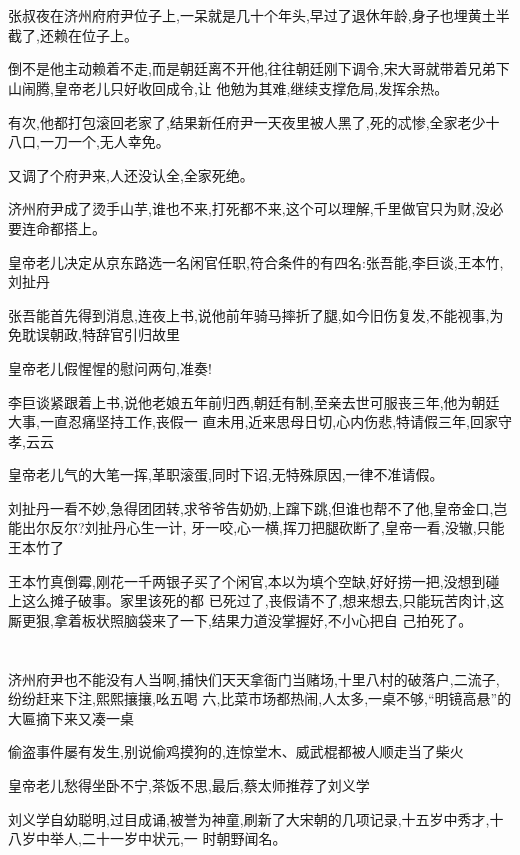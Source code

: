 ﻿\documentclass[12pt]{article}
\begin{document}
\section{}

张叔夜在济州府府尹位子上,一呆就是几十个年头,早过了退休年龄,身子也埋黄土半截了,还赖在位子上。

倒不是他主动赖着不走,而是朝廷离不开他,往往朝廷刚下调令,宋大哥就带着兄弟下山闹腾,皇帝老儿只好收回成令,让
他勉为其难,继续支撑危局,发挥余热。

有次,他都打包滚回老家了,结果新任府尹一天夜里被人黑了,死的忒惨,全家老少十八口,一刀一个,无人幸免。

又调了个府尹来,人还没认全,全家死绝。

济州府尹成了烫手山芋,谁也不来,打死都不来,这个可以理解,千里做官只为财,没必要连命都搭上。

皇帝老儿决定从京东路选一名闲官任职,符合条件的有四名:张吾能,李巨谈,王本竹,刘扯丹

张吾能首先得到消息,连夜上书,说他前年骑马摔折了腿,如今旧伤复发,不能视事,为免耽误朝政,特辞官引归故里

皇帝老儿假惺惺的慰问两句,准奏!

李巨谈紧跟着上书,说他老娘五年前归西,朝廷有制,至亲去世可服丧三年,他为朝廷大事,一直忍痛坚持工作,丧假一
直未用,近来思母日切,心内伤悲,特请假三年,回家守孝,云云

皇帝老儿气的大笔一挥,革职滚蛋,同时下诏,无特殊原因,一律不准请假。

刘扯丹一看不妙,急得团团转,求爷爷告奶奶,上蹿下跳,但谁也帮不了他,皇帝金口,岂能出尔反尔?刘扯丹心生一计,
牙一咬,心一横,挥刀把腿砍断了,皇帝一看,没辙,只能王本竹了

王本竹真倒霉,刚花一千两银子买了个闲官,本以为填个空缺,好好捞一把,没想到碰上这么摊子破事。家里该死的都
已死过了,丧假请不了,想来想去,只能玩苦肉计,这厮更狠,拿着板状照脑袋来了一下,结果力道没掌握好,不小心把自
己拍死了。
\section{}

济州府尹也不能没有人当啊,捕快们天天拿衙门当赌场,十里八村的破落户,二流子,纷纷赶来下注,熙熙攘攘,吆五喝
六,比菜市场都热闹,人太多,一桌不够,``明镜高悬''的大匾摘下来又凑一桌

偷盗事件屡有发生,别说偷鸡摸狗的,连惊堂木、威武棍都被人顺走当了柴火

皇帝老儿愁得坐卧不宁,茶饭不思,最后,蔡太师推荐了刘义学

刘义学自幼聪明,过目成诵,被誉为神童,刷新了大宋朝的几项记录,十五岁中秀才,十八岁中举人,二十一岁中状元,一
时朝野闻名。
\end{document}
